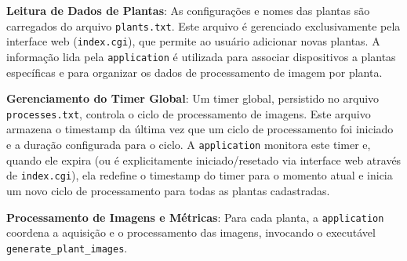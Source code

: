 \documentclass[12pt, a4paper]{article}
\begin{document}
	\textbf{Leitura de Dados de Plantas}: As configurações e nomes das plantas são carregados do arquivo \texttt{plants.txt}. Este arquivo é gerenciado exclusivamente pela interface web (\texttt{index.cgi}), que permite ao usuário adicionar novas plantas. A informação lida pela \texttt{application} é utilizada para associar dispositivos a plantas específicas e para organizar os dados de processamento de imagem por planta.
	
	\textbf{Gerenciamento do Timer Global}: Um timer global, persistido no arquivo \texttt{processes.txt}, controla o ciclo de processamento de imagens. Este arquivo armazena o timestamp da última vez que um ciclo de processamento foi iniciado e a duração configurada para o ciclo. A \texttt{application} monitora este timer e, quando ele expira (ou é explicitamente iniciado/resetado via interface web através de \texttt{index.cgi}), ela redefine o timestamp do timer para o momento atual e inicia um novo ciclo de processamento para todas as plantas cadastradas.
	
	\textbf{Processamento de Imagens e Métricas}: Para cada planta, a \texttt{application} coordena a aquisição e o processamento das imagens, invocando o executável \texttt{generate\_plant\_images}.
	
\end{document}
